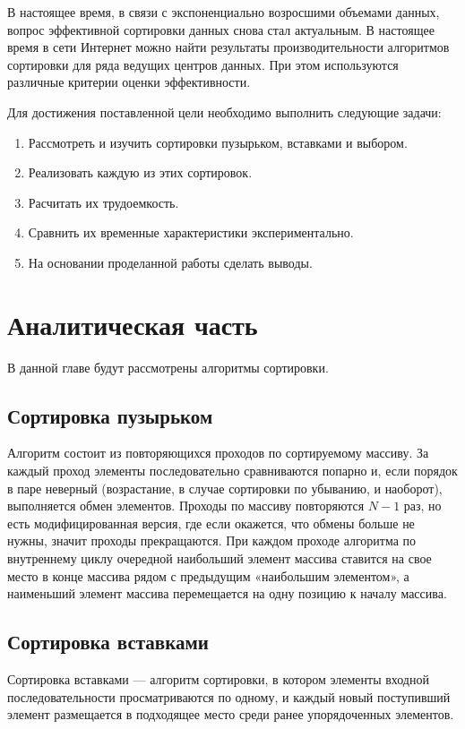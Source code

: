 \documentclass[14pt,russian]{scrartcl}
\begin{document}
В настоящее время, в связи с экспоненциально возросшими объемами данных, вопрос эффективной сортировки данных снова стал актуальным. В настоящее время в сети Интернет можно найти результаты производительности алгоритмов сортировки для ряда ведущих центров данных.
При этом используются различные критерии оценки эффективности. 

Для достижения поставленной цели необходимо выполнить следующие задачи:

\begin{enumerate}
    \item Рассмотреть и изучить сортировки пузырьком, вставками и выбором.
    \item Реализовать каждую из этих сортировок.
    \item Расчитать их трудоемкость.
    \item Сравнить их временные характеристики экспериментально.
    \item На основании проделанной работы сделать выводы.
\end{enumerate}

\section{Аналитическая часть}
В данной главе будут рассмотрены алгоритмы сортировки.

\subsection{Сортировка пузырьком}


Алгоритм состоит из повторяющихся проходов по сортируемому массиву. За каждый проход элементы последовательно сравниваются попарно и, если порядок в паре неверный (возрастание, в случае сортировки по убыванию, и наоборот), выполняется обмен элементов. Проходы по массиву повторяются $N - 1$ раз, но есть модифицированная версия, где если окажется, что обмены больше не нужны, значит проходы прекращаются. При каждом проходе алгоритма по внутреннему циклу очередной наибольший элемент массива ставится на свое место в конце массива рядом с предыдущим «наибольшим элементом», а наименьший элемент массива перемещается на одну позицию к началу массива.

\subsection{Сортировка вставками}

Сортировка вставками — алгоритм сортировки, в котором элементы входной последовательности просматриваются по одному, и каждый новый поступивший элемент размещается в подходящее место среди ранее упорядоченных элементов.
\end{document}

